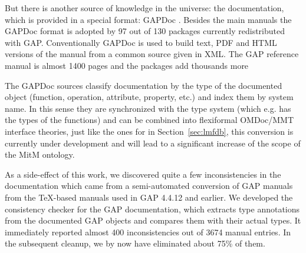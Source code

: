 But there is another source of knowledge in the \GAP universe: the documentation, which is
provided in a special format: GAPDoc \cite{gapdoc}. Besides the main manuals the GAPDoc
format is adopted by 97 out of 130 packages currently redistributed with
GAP. Conventionally GAPDoc is used to build text, PDF and HTML versions of the manual
from a common source given in XML. The GAP reference manual is almost 1400 pages and the
packages add thousands more

The GAPDoc sources classify documentation by the type of the documented object (function,
operation, attribute, property, etc.) and index them by system name. In this sense they
are synchronized with the type system (which e.g. has the types of the functions) and can
be combined into flexiformal OMDoc/MMT interface theories, just like the ones for \LMFDB
in Section~\ref{sec:lmfdb}, this conversion is currently under development and will lead
to a significant increase of the scope of the MitM ontology. 

As a side-effect of this work, we discovered quite a few inconsistencies in the \GAP
documentation which came from a semi-automated conversion of GAP manuals from the
\TeX-based manuals used in GAP 4.4.12 and earlier.  We developed the consistency checker
for the GAP documentation, which extracts type annotations from the documented GAP objects
and compares them with their actual types. It immediately reported almost 400
inconsistencies out of 3674 manual entries. In the subsequent cleanup, we by now have
eliminated about 75\% of them. 


